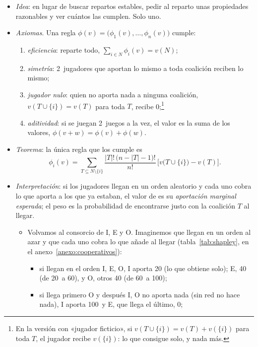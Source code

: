 \documentclass[11pt]{article}
\begin{document}
\begin{itemize}
\item \emph{Idea}\nocite{Shapley1953Value}: en lugar de buscar repartos estables, pedir al reparto unas propiedades razonables y ver cuántos las cumplen. Solo uno.
\item \emph{Axiomas}. Una regla $\phi(v)=\big(\phi_1(v),\dots,\phi_n(v)\big)$ cumple:
  \begin{enumerate}
  \item \emph{eficiencia}: reparte todo, $\sum_{i\in N}\phi_i(v)=v(N)$;
  \item \emph{simetría}: 2~jugadores que aportan lo mismo a toda coalición reciben lo mismo;
  \item \emph{jugador nulo}: quien no aporta nada a ninguna coalición, $v(T\cup\{i\})=v(T)$ para toda $T$, recibe 0;\footnote{En la versión con «jugador ficticio», si $v(T\cup\{i\})=v(T)+v(\{i\})$ para toda $T$, el jugador recibe $v(\{i\})$: lo que consigue solo, y nada más.}
  \item \emph{aditividad}: si se juegan 2~juegos a la vez, el valor es la suma de los valores, $\phi(v+w)=\phi(v)+\phi(w)$.
  \end{enumerate}
\item \emph{Teorema}: la única regla que los cumple es
\begin{equation}\label{eq:shapley}
\phi_i(v)=\sum_{T\subseteq N\setminus\{i\}}\frac{|T|!\,\big(n-|T|-1\big)!}{n!}\,\Big[v\big(T\cup\{i\}\big)-v(T)\Big].
\end{equation}
\item \emph{Interpretación}: si los jugadores llegan en un orden aleatorio y cada uno cobra lo que aporta a los que ya estaban, el valor de  es su \emph{aportación marginal esperada}; el peso es la probabilidad de encontrarse justo con la coalición $T$ al llegar.
  \begin{itemize}
  \item Volvamos al consorcio de \textup{I}, E y O. Imaginemos que llegan en un orden al azar y que cada uno cobra lo que añade al llegar (tabla~\ref{tab:shapley}, en el anexo~\ref{anexo:cooperativos}):
    \begin{itemize}
    \item si llegan en el orden \textup{I}, E, O, \textup{I} aporta 20 (lo que obtiene solo); E, 40 (de 20~a 60), y O, otros 40 (de 60~a 100);
    \item si llega primero O y después \textup{I}, O no aporta nada (sin red no hace nada), \textup{I} aporta 100~y E, que llega el último, 0;

\end{itemize}
\end{itemize}
\end{itemize}
\end{document}
